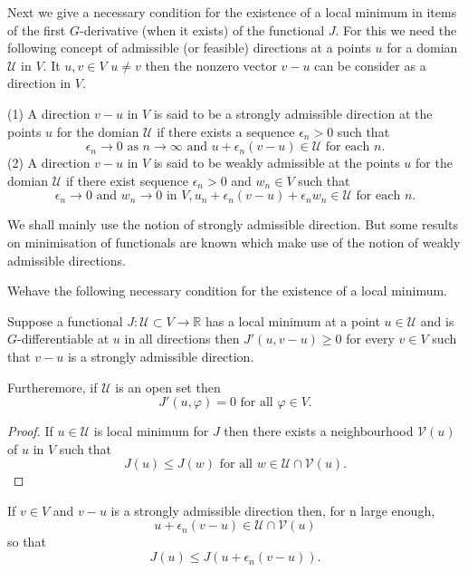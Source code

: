 Next we give a necessary condition for the existence of a local minimum in items of the first $G$-derivative (when it exists) of the functional $J$. For this we need the following concept of admissible (or feasible) directions at a points $u$ for a domian $\mathcal{U}$ in $V$. It $u, v \in V$  $u \neq v$ then the nonzero vector $v - u$ can be consider as a direction in $V$.

\begin{definition}\label{chap2-def1.3}
(1) A direction $v-u$ in $V$ is said to be a strongly admissible direction at the points $u$ for the domian $\mathcal{U}$ if there exists a sequence $\epsilon_{n} > 0$ such that
$$
\epsilon_{n} \to 0 \text{ as } n \to \infty \text{ and } u + \epsilon_{n} (v-u) \in \mathcal{U} \text{ for each }n.
$$ 
(2) A direction $v-u$ in $V$ is said to be weakly admissible at the points $u$ for the domian $\mathcal{U}$ if there exist sequence $\epsilon_{n} > 0$ and $w_{n} \in V$ such that
$$
\epsilon_{n} \to 0 \text{ and } w_{n} \to 0 \text{ in } V, u_{n} + \epsilon_{n} (v-u)+ \epsilon_{n} w_{n} \in \mathcal{U} \text{ for each } n.
$$
\end{definition}

We shall mainly use the notion of strongly admissible direction. But some results on minimisation of functionals are known which make use of the notion of weakly admissible directions.

We\pageoriginale have the following necessary condition for the existence of a local minimum.

\begin{theorem}\label{chap2-thm1.3}
Suppose a functional $J : \mathcal{U} \subset V \to \mathbb{R}$ has a local minimum at a point $u \in \mathcal{U}$ and is $G$-differentiable at $u$ in all directions then $J'(u, v - u) \geq 0$ for every $v \in V$ such that $v-u$ is a strongly admissible direction.

Furtheremore, if $\mathcal{U}$ is an open set then
$$
J'(u, \varphi) = 0 \text{ for all } \varphi \in V.
$$ 
\end{theorem}

\begin{proof}
If $u \in \mathcal{U}$ is local minimum for $J$ then there exists a neighbourhood $\mathscr{V}(u)$ of $u$ in $V$ such that
$$
J(u) \leq J(w) \text{ for all } w \in \mathcal{U} \cap \mathscr{V} (u).
$$
\end{proof}

If $v \in V$ and $v-u$ is a strongly admissible direction then, for n large enough,
$$
u + \epsilon_{n} (v - u) \in \mathcal{U} \cap \mathscr{V}(u)
$$
so that
$$
J(u) \leq J(u + \epsilon_{n} (v-u)).
$$

